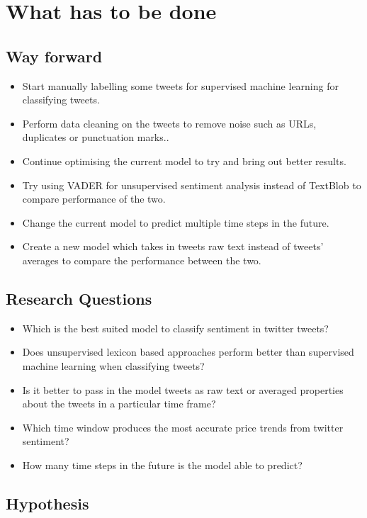 \documentclass{article}
\begin{document}
	\section{What has to be done}
	
	\subsection{Way forward}
	
	\begin{itemize}
	\item Start manually labelling some tweets for supervised machine learning for classifying tweets.
	\item Perform data cleaning on the tweets to remove noise such as URLs, duplicates or punctuation marks..
	\item Continue optimising the current model to try and bring out better results.
	\item Try using VADER for unsupervised sentiment analysis instead of TextBlob to compare performance of the two.
	\item Change the current model to predict multiple time steps in the future.
	\item Create a new model which takes in tweets raw text instead of tweets' averages to compare the performance between the two.
	\end{itemize}
	
	\subsection{Research Questions}
	
	\begin{itemize}
	\item Which is the best suited model to classify sentiment in twitter tweets?
	\item Does unsupervised lexicon based approaches perform better than supervised machine learning when classifying tweets?
	\item Is it better to pass in the model tweets as raw text or averaged properties about the tweets in a particular time frame?
	\item Which time window produces the most accurate price trends from twitter sentiment?
	\item How many time steps in the future is the model able to predict?
	\end{itemize}
	
	\subsection{Hypothesis}
	
\end{document}
